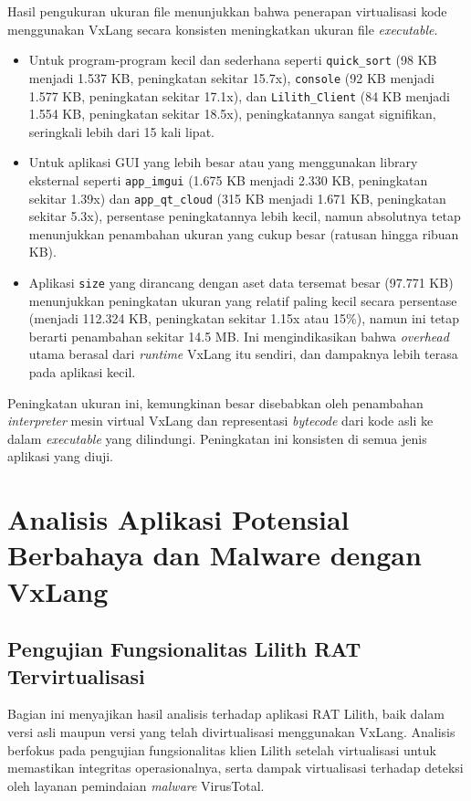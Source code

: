 Hasil pengukuran ukuran file menunjukkan bahwa penerapan virtualisasi kode menggunakan VxLang secara konsisten meningkatkan ukuran file \textit{executable}.
\begin{itemize}
    \item Untuk program-program kecil dan sederhana seperti \texttt{quick\_sort} (98 KB menjadi 1.537 KB, peningkatan sekitar 15.7x), \texttt{console} (92 KB menjadi 1.577 KB, peningkatan sekitar 17.1x), dan \texttt{Lilith\_Client} (84 KB menjadi 1.554 KB, peningkatan sekitar 18.5x), peningkatannya sangat signifikan, seringkali lebih dari 15 kali lipat.
    \item Untuk aplikasi GUI yang lebih besar atau yang menggunakan library eksternal seperti \texttt{app\_imgui} (1.675 KB menjadi 2.330 KB, peningkatan sekitar 1.39x) dan \texttt{app\_qt\_cloud} (315 KB menjadi 1.671 KB, peningkatan sekitar 5.3x), persentase peningkatannya lebih kecil, namun absolutnya tetap menunjukkan penambahan ukuran yang cukup besar (ratusan hingga ribuan KB).
    \item Aplikasi \texttt{size} yang dirancang dengan aset data tersemat besar (97.771 KB) menunjukkan peningkatan ukuran yang relatif paling kecil secara persentase (menjadi 112.324 KB, peningkatan sekitar 1.15x atau 15\%), namun ini tetap berarti penambahan sekitar 14.5 MB. Ini mengindikasikan bahwa \textit{overhead} utama berasal dari \textit{runtime} VxLang itu sendiri, dan dampaknya lebih terasa pada aplikasi kecil.
\end{itemize}
Peningkatan ukuran ini, kemungkinan besar disebabkan oleh penambahan \textit{interpreter} mesin virtual VxLang dan representasi \textit{bytecode} dari kode asli ke dalam \textit{executable} yang dilindungi. Peningkatan ini konsisten di semua jenis aplikasi yang diuji.

\section{Analisis Aplikasi Potensial Berbahaya dan Malware dengan VxLang}
\label{bab:hasil_penelitian_malware} 

\subsection{Pengujian Fungsionalitas Lilith RAT Tervirtualisasi}
\label{subsec:fungsionalitas_lilith_virtualized}
Bagian ini menyajikan hasil analisis terhadap aplikasi RAT Lilith, baik dalam versi asli maupun versi yang telah divirtualisasi menggunakan VxLang. Analisis berfokus pada pengujian fungsionalitas klien Lilith setelah virtualisasi untuk memastikan integritas operasionalnya, serta dampak virtualisasi terhadap deteksi oleh layanan pemindaian \textit{malware} VirusTotal.

